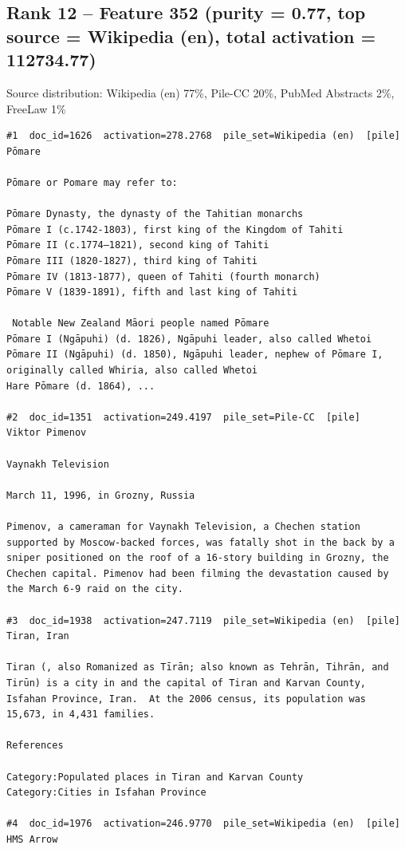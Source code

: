 \subsection*{Rank 12 -- Feature 352 (purity = 0.77, top source = Wikipedia (en), total activation = 112734.77)}

Source distribution: Wikipedia (en) 77\%, Pile-CC 20\%, PubMed Abstracts 2\%, FreeLaw 1\%

\begin{verbatim}
#1  doc_id=1626  activation=278.2768  pile_set=Wikipedia (en)  [pile]
Pōmare

Pōmare or Pomare may refer to:

Pōmare Dynasty, the dynasty of the Tahitian monarchs
Pōmare I (c.1742-1803), first king of the Kingdom of Tahiti
Pōmare II (c.1774–1821), second king of Tahiti
Pōmare III (1820-1827), third king of Tahiti
Pōmare IV (1813-1877), queen of Tahiti (fourth monarch)
Pōmare V (1839-1891), fifth and last king of Tahiti

 Notable New Zealand Māori people named Pōmare
Pōmare I (Ngāpuhi) (d. 1826), Ngāpuhi leader, also called Whetoi
Pōmare II (Ngāpuhi) (d. 1850), Ngāpuhi leader, nephew of Pōmare I, originally called Whiria, also called Whetoi
Hare Pōmare (d. 1864), ...

#2  doc_id=1351  activation=249.4197  pile_set=Pile-CC  [pile]
Viktor Pimenov

Vaynakh Television

March 11, 1996, in Grozny, Russia

Pimenov, a cameraman for Vaynakh Television, a Chechen station supported by Moscow-backed forces, was fatally shot in the back by a sniper positioned on the roof of a 16-story building in Grozny, the Chechen capital. Pimenov had been filming the devastation caused by the March 6-9 raid on the city.

#3  doc_id=1938  activation=247.7119  pile_set=Wikipedia (en)  [pile]
Tiran, Iran

Tiran (, also Romanized as Tīrān; also known as Tehrān, Tihrān, and Tirūn) is a city in and the capital of Tiran and Karvan County, Isfahan Province, Iran.  At the 2006 census, its population was 15,673, in 4,431 families.

References

Category:Populated places in Tiran and Karvan County
Category:Cities in Isfahan Province

#4  doc_id=1976  activation=246.9770  pile_set=Wikipedia (en)  [pile]
HMS Arrow


\end{verbatim}
